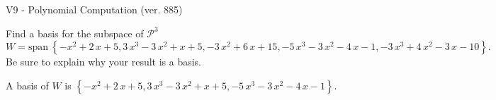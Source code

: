 \begin{exercise}
  \begin{exerciseTitle}V9 - Polynomial Computation (ver. 885)\end{exerciseTitle}
  \begin{exerciseStatement}
    Find a basis for the subspace of \(\mathcal{P}^3\) 
\[W=\mathrm{span}\ \left\{-x^{2} + 2 \, x + 5 , 3 \, x^{3} - 3 \, x^{2} + x + 5 , -3 \, x^{2} + 6 \, x + 15 , -5 \, x^{3} - 3 \, x^{2} - 4 \, x - 1 , -3 \, x^{3} + 4 \, x^{2} - 3 \, x - 10\right\}.\]
 Be sure to explain why your result is a basis.


  \end{exerciseStatement}
  \begin{exerciseAnswer}
   A basis of \(W\) is  \(\left\{-x^{2} + 2 \, x + 5 , 3 \, x^{3} - 3 \, x^{2} + x + 5 , -5 \, x^{3} - 3 \, x^{2} - 4 \, x - 1\right\}\).
  


  \end{exerciseAnswer}
\end{exercise}